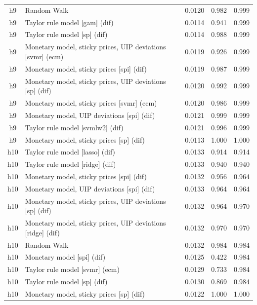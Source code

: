 \begin{ThreePartTable}
\begin{longtable}[t]{cp{5.5cm}ccc}
h9 & \raggedright Random Walk & 0.0120 & 0.982 & 0.999\\
h9 & \raggedright Taylor rule model [gam] (dif) & 0.0114 & 0.941 & 0.999\\
h9 & \raggedright Taylor rule model [sp] (dif) & 0.0114 & 0.988 & 0.999\\
h9 & \raggedright Monetary model, sticky prices, UIP deviations [svmr] (ecm) & 0.0119 & 0.926 & 0.999\\
h9 & \raggedright Monetary model, sticky prices [spi] (dif) & 0.0119 & 0.987 & 0.999\\
h9 & \raggedright Monetary model, sticky prices, UIP deviations [sp] (dif) & 0.0120 & 0.992 & 0.999\\
h9 & \raggedright Monetary model, sticky prices [svmr] (ecm) & 0.0120 & 0.986 & 0.999\\
h9 & \raggedright Monetary model, UIP deviations [spi] (dif) & 0.0121 & 0.999 & 0.999\\
h9 & \raggedright Taylor rule model [svmlw2] (dif) & 0.0121 & 0.996 & 0.999\\
h9 & \raggedright Monetary model, sticky prices [sp] (dif) & 0.0113 & 1.000 & 1.000\\
\addlinespace
h10 & \raggedright Taylor rule model [lasso] (dif) & 0.0133 & 0.914 & 0.914\\
h10 & \raggedright Taylor rule model [ridge] (dif) & 0.0133 & 0.940 & 0.940\\
h10 & \raggedright Monetary model, sticky prices [spi] (dif) & 0.0132 & 0.956 & 0.964\\
h10 & \raggedright Monetary model, UIP deviations [spi] (dif) & 0.0133 & 0.964 & 0.964\\
h10 & \raggedright Monetary model, sticky prices, UIP deviations [sp] (dif) & 0.0132 & 0.964 & 0.970\\
h10 & \raggedright Monetary model, sticky prices, UIP deviations [ridge] (dif) & 0.0132 & 0.970 & 0.970\\
h10 & \raggedright Random Walk & 0.0132 & 0.984 & 0.984\\
h10 & \raggedright Monetary model [spi] (dif) & 0.0125 & 0.422 & 0.984\\
h10 & \raggedright Taylor rule model [svmr] (ecm) & 0.0129 & 0.733 & 0.984\\
h10 & \raggedright Taylor rule model [sp] (dif) & 0.0130 & 0.869 & 0.984\\
h10 & \raggedright Monetary model, sticky prices [sp] (dif) & 0.0122 & 1.000 & 1.000\\

\end{longtable}
\end{ThreePartTable}
